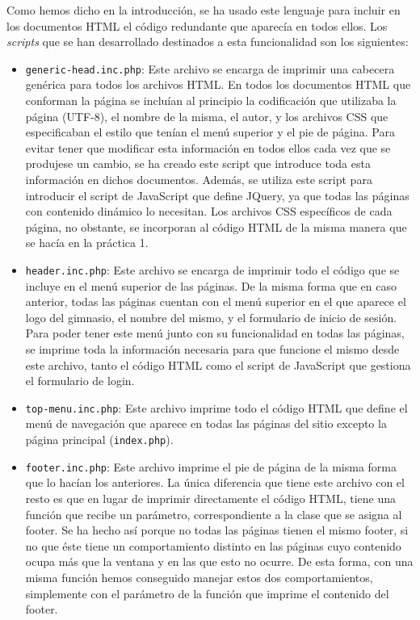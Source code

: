 \documentclass[11pt]{article}
\theoremstyle{plain}
\theoremstyle{definition}
\begin{document}
Como hemos dicho en la introducción, se ha usado este lenguaje para
incluir en los documentos HTML el código redundante que aparecía en
todos ellos. Los \textit{scripts} que se han desarrollado destinados a
esta funcionalidad son los siguientes:

\begin{itemize}
\item \texttt{generic-head.inc.php}: Este archivo se encarga de
  imprimir una cabecera genérica para todos los archivos HTML. En
  todos los documentos HTML que conforman la página se incluían al
  principio la codificación que utilizaba la página (UTF-8), el nombre
  de la misma, el autor, y los archivos CSS que especificaban el
  estilo que tenían el menú superior y el pie de página. Para evitar
  tener que modificar esta información en todos ellos cada vez que se
  produjese un cambio, se ha creado este script que introduce toda
  esta información en dichos documentos. Además, se utiliza este
  script para introducir el script de JavaScript que define JQuery, ya
  que todas las páginas con contenido dinámico lo necesitan. Los
  archivos CSS específicos de cada página, no obstante, se incorporan
  al código HTML de la misma manera que se hacía en la práctica 1.
\item \texttt{header.inc.php}: Este archivo se encarga de imprimir
  todo el código que se incluye en el menú superior de las páginas. De
  la misma forma que en caso anterior, todas las páginas cuentan con
  el menú superior en el que aparece el logo del gimnasio, el nombre
  del mismo, y el formulario de inicio de sesión. Para poder tener
  este menú junto con su funcionalidad en todas las páginas, se
  imprime toda la información necesaria para que funcione el mismo
  desde este archivo, tanto el código HTML como el script de
  JavaScript que gestiona el formulario de login.
\item\texttt{top-menu.inc.php}: Este archivo imprime todo el código
  HTML que define el menú de navegación que aparece en todas las
  páginas del sitio excepto la página principal (\texttt{index.php}).
\item \texttt{footer.inc.php}: Este archivo imprime el pie de página
  de la misma forma que lo hacían los anteriores. La única diferencia
  que tiene este archivo con el resto es que en lugar de imprimir
  directamente el código HTML, tiene una función que recibe un
  parámetro, correspondiente a la clase que se asigna al footer. Se ha
  hecho así porque no todas las páginas tienen el mismo footer, si no
  que éste tiene un comportamiento distinto en las páginas cuyo
  contenido ocupa más que la ventana y en las que esto no ocurre. De
  esta forma, con una misma función hemos conseguido manejar estos
  dos comportamientos, simplemente con el parámetro de la función que
  imprime el contenido del footer.
\end{itemize}
\end{document}
